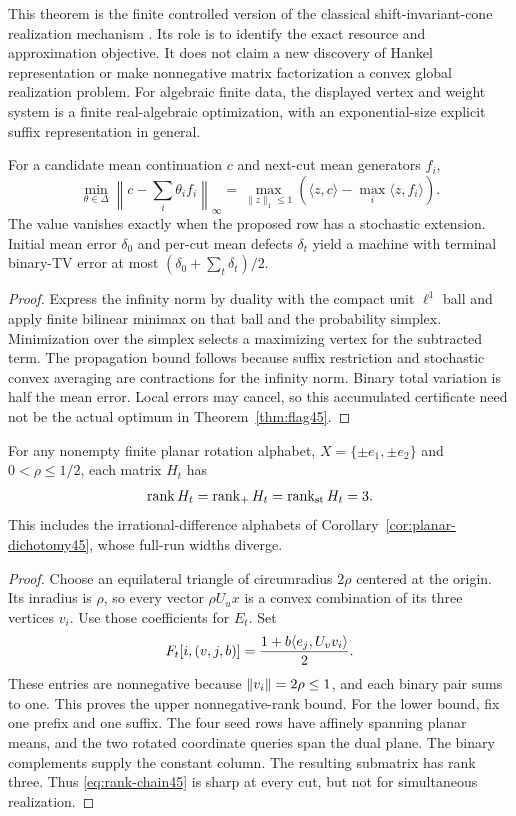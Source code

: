 This theorem is the finite controlled version of the classical shift-invariant-cone realization mechanism \cite{BF,Heller}. Its role is to identify the exact resource and approximation objective. It does not claim a new discovery of Hankel representation or make nonnegative matrix factorization a convex global realization problem. For algebraic finite data, the displayed vertex and weight system is a finite real-algebraic optimization, with an exponential-size explicit suffix representation in general.


\begin{proposition}\label{prop:row-dual45}
For a candidate mean continuation $c$ and next-cut mean generators $f_i$,
\[
 \min_{\theta\in\Delta}\left\|c-\sum_i\theta_i f_i\right\|_\infty
 =\max_{\|z\|_1\le1}\left(\langle z,c\rangle-\max_i\langle z,f_i\rangle\right).
\]
The value vanishes exactly when the proposed row has a stochastic extension. Initial mean error $\delta_0$ and per-cut mean defects $\delta_t$ yield a machine with terminal binary-TV error at most $(\delta_0+\sum_t\delta_t)/2$.
\end{proposition}
\begin{proof}
Express the infinity norm by duality with the compact unit $\ell^1$ ball and apply finite bilinear minimax on that ball and the probability simplex. Minimization over the simplex selects a maximizing vertex for the subtracted term. The propagation bound follows because suffix restriction and stochastic convex averaging are contractions for the infinity norm. Binary total variation is half the mean error. Local errors may cancel, so this accumulated certificate need not be the actual optimum in Theorem~\ref{thm:flag45}.
\end{proof}

\begin{proposition}\label{prop:rank-three45}
For any nonempty finite planar rotation alphabet, $X=\{\pm e_1,\pm e_2\}$ and $0<\rho\le1/2$, each matrix $H_t$ has
\[
 \operatorname{rank} H_t=\operatorname{rank}_+H_t=\operatorname{rank}_{\mathrm{st}}H_t=3.
\]
This includes the irrational-difference alphabets of Corollary~\ref{cor:planar-dichotomy45}, whose full-run widths diverge.
\end{proposition}
\begin{proof}
Choose an equilateral triangle of circumradius $2\rho$ centered at the origin. Its inradius is $\rho$, so every vector $\rho U_ux$ is a convex combination of its three vertices $v_i$. Use those coefficients for $E_t$. Set
\[
 F_t[i,(v,j,b)]=\frac{1+b\langle e_j,U_vv_i\rangle}2.
\]
These entries are nonnegative because $\lVert v_i\rVert=2\rho\le1$, and each binary pair sums to one. This proves the upper nonnegative-rank bound. For the lower bound, fix one prefix and one suffix. The four seed rows have affinely spanning planar means, and the two rotated coordinate queries span the dual plane. The binary complements supply the constant column. The resulting submatrix has rank three. Thus \eqref{eq:rank-chain45} is sharp at every cut, but not for simultaneous realization.
\end{proof}

